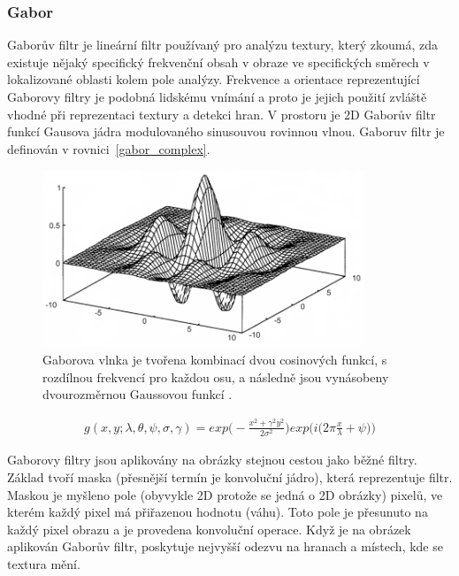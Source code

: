 \documentclass[czech,BP]{thesiskiv}
\begin{document}
\subsubsection{Gabor}
\par Gaborův filtr je lineární filtr používaný pro analýzu textury, který zkoumá, zda existuje nějaký specifický frekvenční obsah v obraze ve specifických směrech v lokalizované oblasti kolem pole analýzy. Frekvence a orientace reprezentující Gaborovy filtry je podobná lidskému vnímání a proto je jejich použití zvláště vhodné při reprezentaci textury a detekci hran. V prostoru je 2D Gaborův filtr funkcí Gausova jádra modulovaného sinusouvou rovinnou vlnou. Gaboruv filtr je definován v rovnici~\ref{gabor_complex}.

\begin{figure}[H]
		\centering
		\includegraphics[height=200px]{./img/gabor.png}
		\caption{Gaborova vlnka je tvořena kombinací dvou cosinových funkcí, s rozdílnou frekvencí pro každou osu, a následně jsou vynásobeny dvourozměrnou Gaussovou funkcí \cite{Gabor}.} 					
\end{figure}

\begin{align}
   \label{gabor_complex}  g(x, y; \lambda, \theta, \psi, \sigma,  \gamma) = exp \Bigg( - \frac{{x^2 + \gamma^2 y^2}}{2 \sigma^2} \Bigg) exp \Bigg(i \bigg(2\pi \frac{x}{\lambda} + \psi \bigg)\Bigg)  
\end{align}

\par Gaborovy filtry jsou aplikovány na obrázky stejnou cestou jako běžné filtry. Základ tvoří maska (přesnější termín je konvoluční jádro), která reprezentuje filtr. Maskou je myšleno pole (obyvykle 2D protože se jedná o 2D obrázky) pixelů, ve kterém každý pixel má přiřazenou hodnotu (váhu). Toto pole je přesunuto na každý pixel obrazu a je provedena konvoluční operace. Když je na obrázek aplikován Gaborův filtr, poskytuje nejvyšší odezvu na hranach a místech, kde se textura mění. \cite{Gabor_wordpress}
\end{document}
